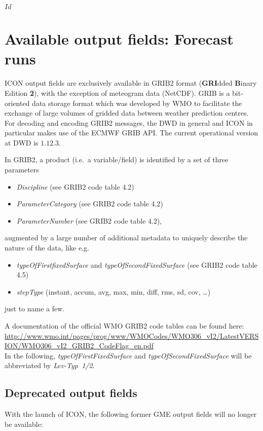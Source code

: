 \svnInfo $Id$
\chapter{Available output fields: Forecast runs}

ICON output fields are exclusively available in GRIB2 format (\textbf{GRI}dded \textbf{B}inary Edition \textbf{2}), with the exception of 
meteogram data (NetCDF). GRIB is a bit-oriented data storage format which was developed by WMO to facilitate the exchange of large volumes of 
gridded data between weather prediction centres. For decoding and encoding GRIB2 messages, the DWD in general and ICON in particular 
makes use of the ECMWF GRIB API. The current operational version at DWD is $1.12.3$.
 
In GRIB2, a product (i.e.\ a variable/field) is identified by a set of three parameters
\begin{itemize}
 \item \emph{Discipline} (see GRIB2 code table 4.2)
 \item \emph{ParameterCategory} (see GRIB2 code table 4.2)
 \item \emph{ParameterNumber} (see GRIB2 code table 4.2), 
\end{itemize}
augmented by a large number of additional metadata to uniquely describe the nature of the data, like e.g.\
\begin{itemize}
  \item \emph{typeOfFirstfixedSurface} and \emph{typeOfSecondFixedSurface} (see GRIB2 code table 4.5)
  \item \emph{stepType} (instant, accum, avg, max, min, diff, rms, sd, cov, \dots)
 \end{itemize}
just to name a few.

A documentation of the official WMO GRIB2 code tables can be found here: \url{http://www.wmo.int/pages/prog/www/WMOCodes/WMO306_vI2/LatestVERSION/WMO306_vI2_GRIB2_CodeFlag_en.pdf}\\
In the following, \emph{typeOfFirstFixedSurface} and \emph{typeOfSecondFixedSurface} will be abbreviated by \emph{Lev-Typ~1/2}.



\section{Deprecated output fields}
With the launch of ICON, the following former GME output fields will no longer be available:

